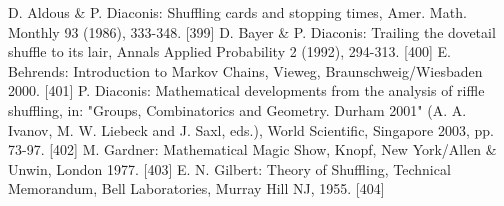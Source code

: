 \documentclass[a4paper]{article}
\begin{document}
\begin{thebibliography}{9}
     D. Aldous \& P. Diaconis: Shuffling cards and stopping times, Amer. Math. Monthly 93 (1986), 333-348. [399]
     D. Bayer \& P. Diaconis: Trailing the dovetail shuffle to its lair, Annals Applied Probability 2 (1992), 294-313. [400]
     E. Behrends: Introduction to Markov Chains, Vieweg, Braunschweig/Wiesbaden 2000. [401]
     P. Diaconis: Mathematical developments from the analysis of riffle shuffling, in: "Groups, Combinatorics and Geometry. Durham 2001" (A. A. Ivanov, M. W. Liebeck and J. Saxl, eds.), World Scientific, Singapore 2003, pp. 73-97. [402]
     M. Gardner: Mathematical Magic Show, Knopf, New York/Allen \& Unwin, London 1977. [403]
     E. N. Gilbert: Theory of Shuffling, Technical Memorandum, Bell Laboratories, Murray Hill NJ, 1955. [404]
\end{thebibliography}
\end{document}
